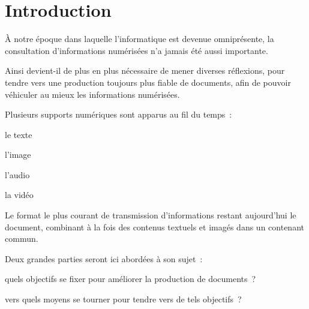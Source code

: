\section{Introduction}

À notre époque dans laquelle l’informatique est devenue omniprésente,
la consultation d’informations numérisées n’a jamais été aussi importante.

Ainsi devient-il de plus en plus nécessaire de mener diverses réflexions,
pour tendre vers une production toujours plus fiable de documents,
afin de pouvoir véhiculer au mieux les informations numérisées.

Plusieurs supports numériques sont apparus au fil du temps :
\begin{itmz}
\item{le texte}
\item{l’image}
\item{l’audio}
\item{la vidéo}
\end{itmz}
Le format le plus courant de transmission d’informations restant aujourd’hui
le document, combinant à la fois des contenus textuels et imagés dans un contenant commun.

Deux grandes parties seront ici abordées à son sujet :
\begin{enum}
\item{quels objectifs se fixer pour améliorer la production de documents ?}
\item{vers quels moyens se tourner pour tendre vers de tels objectifs ?}
\end{enum}

\pagebreak
